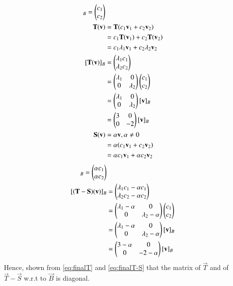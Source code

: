 \documentclass[journal,12pt]{IEEEtran}
\begin{document}
\begin{align}
    [\vec{v}]_B = \myvec{c_1 \\ c_2}\\
    \vec{T}(\vec{v}) & = \vec{T}(c_1\vec{v}_1 + c_2\vec{v}_2)\\& = c_1\vec{T}(\vec{v}_1) + c_2\vec{T}(\vec{v}_2)\\ & = c_1\lambda_1\vec{v}_1 + c_2\lambda_2\vec{v}_2\\
    [\vec{T}(\vec{v})]_B & = \myvec{\lambda_1 c_1\\ \lambda_2 c_2} \\&
    = \myvec{\lambda_1 & 0 \\ 0 & \lambda_2}\myvec{c_1 \\ c_2} \\&
    = \myvec{\lambda_1 & 0 \\ 0 & \lambda_2} [\vec{v}]_B \\& = \myvec{3 & 0\\0&-2}[\vec{v}]_B \label{eq:finalT}\\
    \vec{S}(\vec{v}) & = \alpha\vec{v}, \alpha \neq 0\\&
    = \alpha(c_1\vec{v}_1 + c_2\vec{v}_2)\\&
    = \alpha c_1\vec{v}_1 + \alpha c_2\vec{v}_2
\end{align}
\begin{align}
    [\vec{S}(\vec{v})]_B = \myvec{\alpha c_1\\ \alpha c_2}\\
    [(\vec{T}-\vec{S})(\vec{v})]_B & = \myvec{\lambda_1 c_1 -\alpha c_1 \\ \lambda_2 c_2 -\alpha c_2}\\ & = \myvec{\lambda_1 -\alpha & 0 \\ 0 & \lambda_2 - \alpha}\myvec{c_1 \\ c_2}\\ &
    = \myvec{\lambda_1 -\alpha & 0 \\ 0 & \lambda_2 - \alpha}[\vec{v}]_B \\ & = \myvec{3 -\alpha & 0 \\ 0 & -2 - \alpha}[\vec{v}]_B \label{eq:finalT-S}
\end{align}
Hence, shown from \eqref{eq:finalT} and \eqref{eq:finalT-S} that the matrix of $\vec{T}$ and of $\vec{T}-\vec{S}$ w.r.t to $\vec{B}$ is diagonal.
\end{document}
